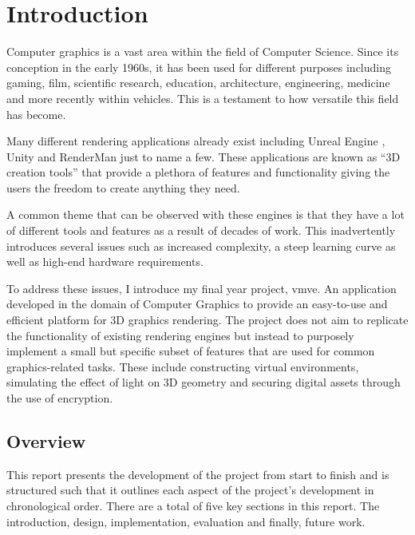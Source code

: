 \documentclass[11pt]{article}
\begin{document}
\section{Introduction}

Computer graphics is a vast area within the field of Computer Science. Since its
conception in the early 1960s, it has been used for different purposes including
gaming, film, scientific research, education, architecture, engineering,
medicine and more recently within vehicles. This is a testament to how versatile
this field has become.

Many different rendering applications already exist including Unreal Engine
\cite{unreal_engine}, Unity \cite{unity} and RenderMan \cite{render_man} just to
name a few. These applications are known as ``3D creation tools'' that provide a
plethora of features and functionality giving the users the freedom to create
anything they need.

A common theme that can be observed with these engines is that they have a lot
of different tools and features as a result of decades of work. This
inadvertently introduces several issues such as increased complexity, a steep
learning curve as well as high-end hardware requirements.

To address these issues, I introduce my final year project, \gls*{vmve}. An
application developed in the domain of Computer Graphics to provide an
easy-to-use and efficient platform for 3D graphics rendering. The project does
not aim to replicate the functionality of existing rendering engines but instead
to purposely implement a small but specific subset of features that are used for
common graphics-related tasks. These include constructing virtual environments,
simulating the effect of light on 3D geometry and securing digital assets
through the use of encryption.



\subsection{Overview}
This report presents the development of the project from start to finish and is
structured such that it outlines each aspect of the project's development in
chronological order. There are a total of five key sections in this report. The
introduction, design, implementation, evaluation and finally, future work.
\end{document}
